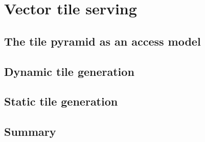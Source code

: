\section{Vector tile serving}
\subsection{The tile pyramid as an access model}
\subsection{Dynamic tile generation}
\subsection{Static tile generation}
\subsection{Summary}